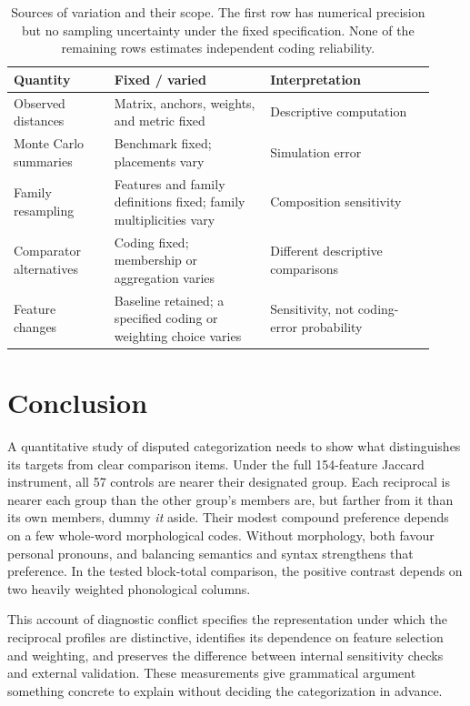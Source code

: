 \documentclass[12pt]{article}
\providecommand{\mention}[1]{\textit{#1}}
\begin{document}
\begin{table}[htbp]
\centering\small
\begin{tabular}{@{}>{\raggedright\arraybackslash}p{0.22\linewidth}>{\raggedright\arraybackslash}p{0.34\linewidth}>{\raggedright\arraybackslash}p{0.36\linewidth}@{}}
\toprule
Quantity & Fixed / varied & Interpretation \\
\midrule
Observed distances & Matrix, anchors, weights, and metric fixed & Descriptive computation \\
Monte Carlo summaries & Benchmark fixed; placements vary & Simulation error \\
Family resampling & Features and family definitions fixed; family multiplicities vary & Composition sensitivity \\
Comparator alternatives & Coding fixed; membership or aggregation varies & Different descriptive comparisons \\
Feature changes & Baseline retained; a specified coding or weighting choice varies & Sensitivity, not coding-error probability \\
\bottomrule
\end{tabular}
\caption{Sources of variation and their scope. The first row has numerical precision but no sampling uncertainty under the fixed specification. None of the remaining rows estimates independent coding reliability.}
\label{tab:uncertainty}
\end{table}

\section{Conclusion}

A quantitative study of disputed categorization needs to show what distinguishes its targets from clear comparison items. Under the full 154-feature Jaccard instrument, all 57 controls are nearer their designated group. Each reciprocal is nearer each group than the other group's members are, but farther from it than its own members, dummy \mention{it} aside. Their modest compound preference depends on a few whole-word morphological codes. Without morphology, both favour personal pronouns, and balancing semantics and syntax strengthens that preference. In the tested block-total comparison, the positive contrast depends on two heavily weighted phonological columns.

This account of diagnostic conflict specifies the representation under which the reciprocal profiles are distinctive, identifies its dependence on feature selection and weighting, and preserves the difference between internal sensitivity checks and external validation. These measurements give grammatical argument something concrete to explain without deciding the categorization in advance.
\end{document}
